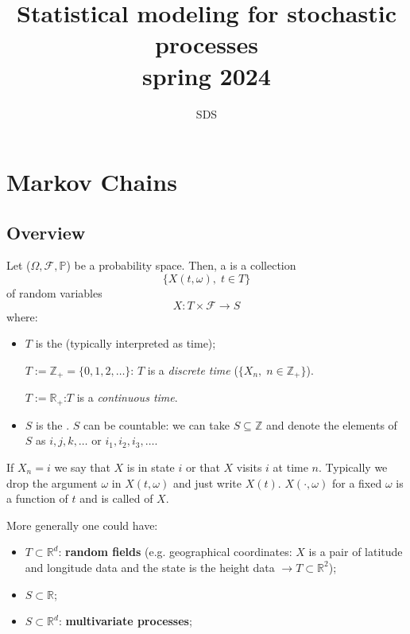\documentclass{article}
\begin{document}
	\title{Statistical modeling for stochastic processes\\ spring 2024}
	\author{SDS}
	\date{}
	\maketitle
	\tableofcontents
	\section{Markov Chains}
	\subsection{Overview}
	Let ($\Omega, \mathscr{F}, \mathbb{P}$) be a probability space. Then, a  is a collection 
	\[\{X(t,\omega), \; t\in T\}\]
	of random variables
	\[X:T\times\mathscr{F} \longrightarrow S\]
	where:
	\begin{itemize}
		\item $T$ is the  (typically interpreted as time); 
		\begin{example}
			$T:= \mathbb{Z}_+=\{0,1,2,\ldots\}$: $T$ is a \textit{discrete time} ($\{X_n, \; n\in\mathbb{Z}_+\}$).
		\end{example}
		\begin{example}
			$T:=\mathbb{R_+}$:$T$ is a \textit{continuous time}.
		\end{example}
		\item $S$ is the . $S$ can be countable: we can take $S \subseteq \mathbb{Z}$ and denote the elements of $S$ as $i, j, k, \ldots$ or $i_1, i_2, i_3, \ldots$.
	\end{itemize}
	If $X_n=i$ we say that $X$ is in state $i$ or that $X$ visits $i$ at time $n$. Typically we drop the argument $\omega$ in $X(t,\omega)$ and just write $X(t)$. $X(\cdot,\omega)$ for a fixed $\omega$ is a function of $t$ and is called  of $X$.
	
	More generally one could have:
	\begin{itemize}
		\item $T \subset \mathbb{R}^d$: \textbf{random fields} (e.g. geographical coordinates: $X$ is a pair of latitude and longitude data and the state is the height data $\rightarrow T \subset \mathbb{R}^2$);
		\item $S \subset \mathbb{R}$;
		\item $S \subset \mathbb{R}^d$: \textbf{multivariate processes};
	\end{itemize}
	
\end{document}
